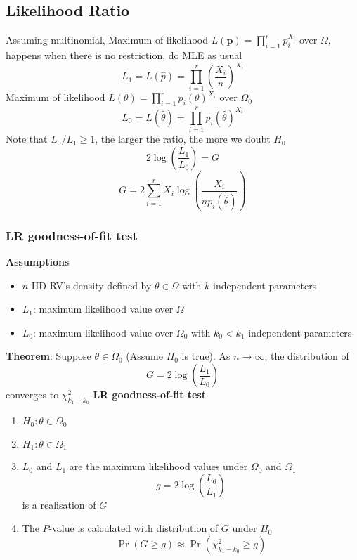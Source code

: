 \documentclass{article}
\begin{document}
\begin{multicols}{2}
\subsection{Likelihood Ratio}
Assuming multinomial, Maximum of likelihood $L(\textbf{p}) = \prod_{i=1}^{r}p_i^{X_i}$ over $\Omega$, happens when there is no restriction, do MLE as usual
$$L_1 = L(\hat{p}) = \prod_{i=1}^{r}\left(\frac{X_i}{n}\right)^{X_i}$$
Maximum of likelihood $L(\theta) = \prod_{i=1}^{r}p_i(\theta)^{X_i}$ over $\Omega_0$
$$L_0 = L(\hat{\theta}) = \prod_{i=1}^{r} p_i(\hat{\theta})^{X_i}$$
Note that $L_0/L_1 \geq1$, the larger the ratio, the more we doubt $H_0$
$$2\log\left(\frac{L_1}{L_0}\right)=G$$
$$G=2\sum_{i=1}^rX_i\log{ \left(\frac{X_i}{np_i(\hat{\theta})}\right) }$$
\subsubsection{LR goodness-of-fit test}
\textbf{Assumptions}
\begin{itemize}
	\item $n$ IID RV's density defined by $\theta \in \Omega$ with $k$ independent parameters
	\item $L_1$: maximum likelihood value over $\Omega$
	\item $L_0$: maximum likelihood value over $\Omega_0$ with $k_0<k_1$ independent parameters
\end{itemize}
\textbf{Theorem}: Suppose $\theta\in\Omega_0$ (Assume $H_0$ is true). As $n\rightarrow\infty$, the distribution of
$$G = 2\log\left(\frac{L_1}{L_0}\right)$$ converges to $\chi^2_{k_1-k_0}$
\textbf{LR goodness-of-fit test}
\begin{enumerate}
	\item $H_0:\theta\in\Omega_0$
	\item $H_1:\theta\in\Omega_1$
	\item $L_0$ and $L_1$ are the maximum likelihood values under $\Omega_0$ and $\Omega_1$
	$$g=2\log\left(\frac{L_0}{L_1}\right)$$
	is a realisation of $G$
	\item The $P$-value is calculated with distribution of $G$ under $H_0$
	$$\Pr(G\geq g) \approx \Pr(\chi^2_{k_1-k_0}\geq g)$$
\end{enumerate}




\end{multicols}
\end{document}
